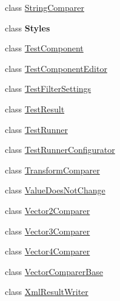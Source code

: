 \begin{DoxyCompactItemize}
class \hyperlink{class_unity_test_1_1_string_comparer}{String\+Comparer}
\item 
class {\bfseries Styles}
\item 
class \hyperlink{class_unity_test_1_1_test_component}{Test\+Component}
\item 
class \hyperlink{class_unity_test_1_1_test_component_editor}{Test\+Component\+Editor}
\item 
class \hyperlink{class_unity_test_1_1_test_filter_settings}{Test\+Filter\+Settings}
\item 
class \hyperlink{class_unity_test_1_1_test_result}{Test\+Result}
\item 
class \hyperlink{class_unity_test_1_1_test_runner}{Test\+Runner}
\item 
class \hyperlink{class_unity_test_1_1_test_runner_configurator}{Test\+Runner\+Configurator}
\item 
class \hyperlink{class_unity_test_1_1_transform_comparer}{Transform\+Comparer}
\item 
class \hyperlink{class_unity_test_1_1_value_does_not_change}{Value\+Does\+Not\+Change}
\item 
class \hyperlink{class_unity_test_1_1_vector2_comparer}{Vector2\+Comparer}
\item 
class \hyperlink{class_unity_test_1_1_vector3_comparer}{Vector3\+Comparer}
\item 
class \hyperlink{class_unity_test_1_1_vector4_comparer}{Vector4\+Comparer}
\item 
class \hyperlink{class_unity_test_1_1_vector_comparer_base}{Vector\+Comparer\+Base}
\item 
class \hyperlink{class_unity_test_1_1_xml_result_writer}{Xml\+Result\+Writer}
\end{DoxyCompactItemize}
